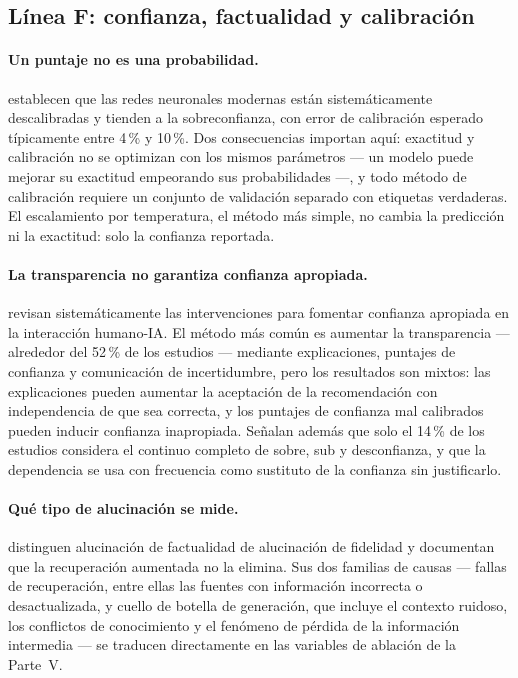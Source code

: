 \subsection{Línea F: confianza, factualidad y calibración}
\label{sec:arte-f}

\paragraph{Un puntaje no es una probabilidad.}
\textcite{guo2017calibration} establecen que las redes neuronales modernas están
sistemáticamente descalibradas y tienden a la sobreconfianza, con error de calibración
esperado típicamente entre 4\,\% y 10\,\%. Dos consecuencias importan aquí: exactitud y
calibración no se optimizan con los mismos parámetros --- un modelo puede mejorar su
exactitud empeorando sus probabilidades ---, y todo método de calibración requiere un
conjunto de validación separado con etiquetas verdaderas. El escalamiento por
temperatura, el método más simple, no cambia la predicción ni la exactitud: solo la
confianza reportada.

\paragraph{La transparencia no garantiza confianza apropiada.}
\textcite{mehrotra2024systematic} revisan sistemáticamente las intervenciones para
fomentar confianza apropiada en la interacción humano-IA. El método más común es
aumentar la transparencia --- alrededor del 52\,\% de los estudios --- mediante
explicaciones, puntajes de confianza y comunicación de incertidumbre, pero los
resultados son mixtos: las explicaciones pueden aumentar la aceptación de la
recomendación con independencia de que sea correcta, y los puntajes de confianza mal
calibrados pueden inducir confianza inapropiada. Señalan además que solo el 14\,\% de
los estudios considera el continuo completo de sobre, sub y desconfianza, y que la
dependencia se usa con frecuencia como sustituto de la confianza sin justificarlo.

\paragraph{Qué tipo de alucinación se mide.}
\textcite{huang2025survey} distinguen alucinación de factualidad de alucinación de
fidelidad y documentan que la recuperación aumentada no la elimina. Sus dos familias
de causas --- fallas de recuperación, entre ellas las fuentes con información
incorrecta o desactualizada, y cuello de botella de generación, que incluye el
contexto ruidoso, los conflictos de conocimiento y el fenómeno de pérdida de la
información intermedia --- se traducen directamente en las variables de ablación de
la Parte~V.

